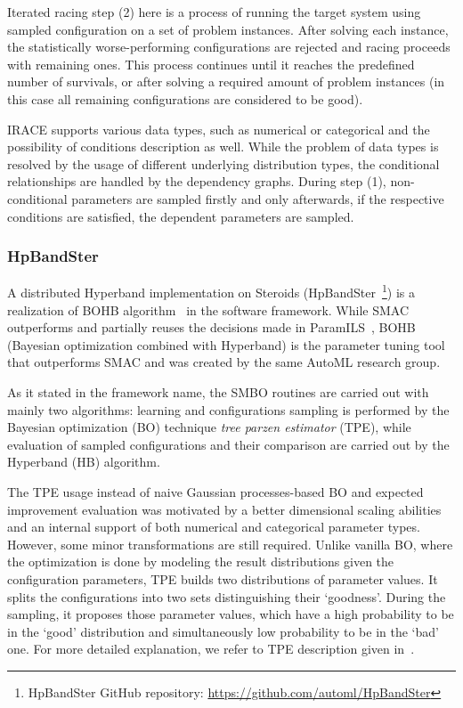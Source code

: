 Iterated racing step (2) here is a process of running the target system using sampled configuration on a set of problem instances. After solving each instance, the statistically worse-performing configurations are rejected and racing proceeds with remaining ones. This process continues until it reaches the predefined number of survivals, or after solving a required amount of problem instances (in this case all remaining configurations are considered to be good). 

IRACE supports various data types, such as numerical or categorical and the possibility of conditions description as well. While the problem of data types is resolved by the usage of different underlying distribution types, the conditional relationships are handled by the dependency graphs. During step (1), non-conditional parameters are sampled firstly and only afterwards, if the respective conditions are satisfied, the dependent parameters are sampled.


\subsubsection{HpBandSter}\label{bg: bohb}
A distributed Hyperband implementation on Steroids (HpBandSter~\footnote{HpBandSter GitHub repository: \url{https://github.com/automl/HpBandSter}}) is a realization of BOHB algorithm~\cite{falkner2018bohb} in the software framework.
While SMAC outperforms and partially reuses the decisions made in ParamILS~\cite{hutter2009paramils}, BOHB (Bayesian optimization combined with Hyperband) is the parameter tuning tool that outperforms SMAC and was created by the same AutoML research group.

As it stated in the framework name, the SMBO routines are carried out with mainly two algorithms: learning and configurations sampling is performed by the Bayesian optimization (BO) technique \emph{tree parzen estimator} (TPE), while evaluation of sampled configurations and their comparison are carried out by the Hyperband (HB) algorithm.

The TPE usage instead of naive Gaussian processes-based BO and expected improvement evaluation was motivated by a better dimensional scaling abilities and an internal support of both numerical and categorical parameter types. However, some minor transformations are still required.
Unlike vanilla BO, where the optimization is done by modeling the result distributions given the configuration parameters, TPE builds two distributions of parameter values. It splits the configurations into two sets distinguishing their `goodness'. During the sampling, it proposes those parameter values, which have a high probability to be in the `good' distribution and simultaneously low probability to be in the `bad' one. For more detailed explanation, we refer to TPE description given in~\cite{bergstra2011algorithms}.

